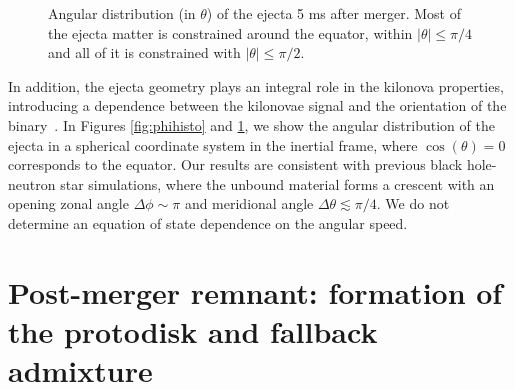 \begin{figure}
	\centering
	
	\caption[Angular distribution (in $\theta$) of the ejecta]{
		Angular distribution (in $\theta$) of the ejecta 5 ms after merger.  
		Most of the ejecta matter is constrained around the equator, within $|\theta| \leq \pi/4$ and all of it is constrained with $|\theta| \leq \pi/2$.
	}
	\label{fig:costhetahisto}
\end{figure}


In addition, the ejecta geometry plays an integral role in the kilonova properties, introducing a dependence between the kilonovae signal and the orientation of the binary~\cite{FoucartDD2:2017}.
In Figures \ref{fig:phihisto} and \ref{fig:costhetahisto}, we show the angular distribution of the ejecta in a spherical coordinate system in the inertial frame, where $\cos(\theta) = 0$ corresponds to the equator.  
Our results are consistent with previous black hole-neutron star simulations, where the unbound material forms a crescent with an opening zonal angle $\Delta \phi \sim \pi$ and meridional angle $\Delta \theta \lesssim \pi/4$.
We do not determine an equation of state dependence on the angular speed.


\section{Post-merger remnant: formation of the protodisk and fallback admixture}
\label{sec:disk-analysis}

